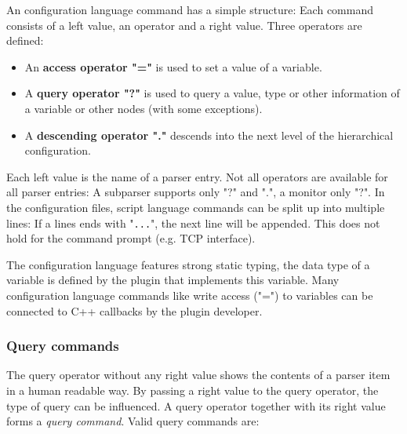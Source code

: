An \mha{} configuration language command has a simple structure: Each
command consists of a left value, an operator and a
right value. Three operators are defined:

%
%
%
\begin{itemize}
\item An {\bf access operator "="} is used to set a value of a variable.
\item A {\bf query operator "?"}
  is used to query a value, type or other information of a variable or other
  nodes (with some exceptions).
\item A {\bf descending operator "."} descends into the next level of the
  hierarchical \mha{} configuration.
\end{itemize}

Each left value is the name of a parser entry. Not all operators are
available for all parser entries: A subparser supports only "?" and
".", a monitor only "?". In the configuration files, \mha{} script
language commands can be split up into multiple lines: If a lines ends with "\verb!...!", the next line will be
appended. This does not hold for the command prompt (e.g. TCP interface).

The \mha{} configuration language features strong static typing, the data type
of a variable is defined by the plugin that implements this variable.
Many configuration language commands like write access ("=") to variables can
be connected to C++ callbacks by the plugin developer.

\subsubsection{Query commands}

%
The query operator without any right value shows the contents of a parser item
in a human readable way. By passing a right value to the query operator, the
type of query can be influenced. A query operator together with its right
value forms a {\em query command}. Valid query commands
are:
%
%
%
%
%
%
%
%

